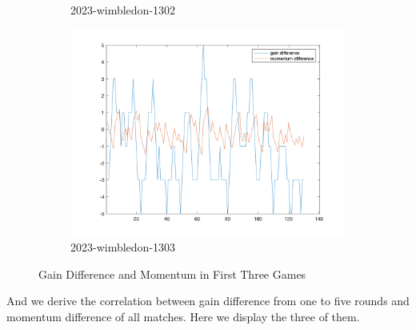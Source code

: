 \begin{figure}[H]
\begin{subfigure}[b]{0.34\textwidth}
        \caption{2023-wimbledon-1302}
    \end{subfigure}\hspace{-0.02\textwidth}
    \begin{subfigure}[b]{0.34\textwidth}
        \includegraphics[width=\linewidth]{mainmatter/imgs/diff_match3.png}
        \caption{2023-wimbledon-1303}
    \end{subfigure}
    \caption{Gain Difference and Momentum in First Three Games}
    \label{fig:Gain Difference and Momentum}
\end{figure}

And we derive the correlation between gain difference from one to five rounds 
and momentum difference of all matches. Here we display the three of them.

